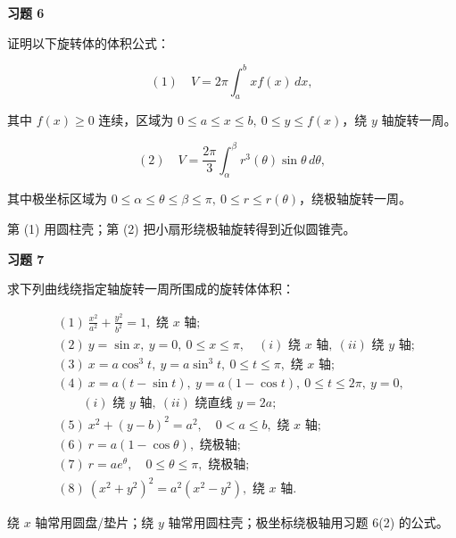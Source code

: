 \begin{exercisebox}
\textbf{习题 6 }

证明以下旋转体的体积公式：

\[
      (1)\quad
      V=2\pi\int_a^b xf(x)\,dx,
      \]

其中 \(f(x)\ge0\) 连续，区域为 \(0\le a\le x\le b,\ 0\le y\le f(x)\)，绕 \(y\) 轴旋转一周。

\[
      (2)\quad
      V=\frac{2\pi}{3}\int_\alpha^\beta r^3(\theta)\sin\theta\,d\theta,
      \]

其中极坐标区域为 \(0\le\alpha\le\theta\le\beta\le\pi,\ 0\le r\le r(\theta)\)，绕极轴旋转一周。

\begin{hintbox}
第 (1) 用圆柱壳；第 (2) 把小扇形绕极轴旋转得到近似圆锥壳。
\end{hintbox}
\end{exercisebox}

\begin{exercisebox}
\textbf{习题 7 }

求下列曲线绕指定轴旋转一周所围成的旋转体体积：

\[
      \begin{aligned}
      &(1)\ \frac{x^2}{a^2}+\frac{y^2}{b^2}=1,\text{ 绕 }x\text{ 轴};\\
      &(2)\ y=\sin x,\ y=0,\ 0\le x\le\pi,\quad (i)\text{ 绕 }x\text{ 轴},\ (ii)\text{ 绕 }y\text{ 轴};\\
      &(3)\ x=a\cos^3t,\ y=a\sin^3t,\ 0\le t\le\pi,\text{ 绕 }x\text{ 轴};\\
      &(4)\ x=a(t-\sin t),\ y=a(1-\cos t),\ 0\le t\le2\pi,\ y=0,\\
      &\qquad (i)\text{ 绕 }y\text{ 轴},\ (ii)\text{ 绕直线 }y=2a;\\
      &(5)\ x^2+(y-b)^2=a^2,\quad0<a\le b,\text{ 绕 }x\text{ 轴};\\
      &(6)\ r=a(1-\cos\theta),\text{ 绕极轴};\\
      &(7)\ r=ae^\theta,\quad0\le\theta\le\pi,\text{ 绕极轴};\\
      &(8)\ (x^2+y^2)^2=a^2(x^2-y^2),\text{ 绕 }x\text{ 轴}.
      \end{aligned}
      \]

\begin{hintbox}
绕 \(x\) 轴常用圆盘/垫片；绕 \(y\) 轴常用圆柱壳；极坐标绕极轴用习题 6(2) 的公式。
\end{hintbox}
\end{exercisebox}

